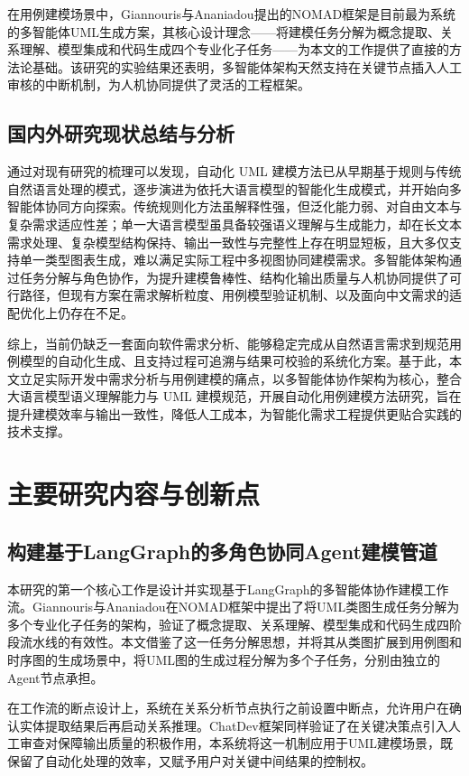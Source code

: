 在用例建模场景中，Giannouris与Ananiadou\cite{giannouris2025nomad}提出的NOMAD框架是目前最为系统的多智能体UML生成方案，其核心设计理念——将建模任务分解为概念提取、关系理解、模型集成和代码生成四个专业化子任务——为本文的工作提供了直接的方法论基础。该研究的实验结果还表明，多智能体架构天然支持在关键节点插入人工审核的中断机制，为人机协同提供了灵活的工程框架。

\subsection{国内外研究现状总结与分析}

通过对现有研究的梳理可以发现，自动化 UML 建模方法已从早期基于规则与传统自然语言处理的模式，逐步演进为依托大语言模型的智能化生成模式，并开始向多智能体协同方向探索。传统规则化方法虽解释性强，但泛化能力弱、对自由文本与复杂需求适应性差；单一大语言模型虽具备较强语义理解与生成能力，却在长文本需求处理、复杂模型结构保持、输出一致性与完整性上存在明显短板，且大多仅支持单一类型图表生成，难以满足实际工程中多视图协同建模需求。多智能体架构通过任务分解与角色协作，为提升建模鲁棒性、结构化输出质量与人机协同提供了可行路径，但现有方案在需求解析粒度、用例模型验证机制、以及面向中文需求的适配优化上仍存在不足。

综上，当前仍缺乏一套面向软件需求分析、能够稳定完成从自然语言需求到规范用例模型的自动化生成、且支持过程可追溯与结果可校验的系统化方案。基于此，本文立足实际开发中需求分析与用例建模的痛点，以多智能体协作架构为核心，整合大语言模型语义理解能力与 UML 建模规范，开展自动化用例建模方法研究，旨在提升建模效率与输出一致性，降低人工成本，为智能化需求工程提供更贴合实践的技术支撑。

\section{主要研究内容与创新点}

\subsection{构建基于LangGraph的多角色协同Agent建模管道}

本研究的第一个核心工作是设计并实现基于LangGraph的多智能体协作建模工作流。Giannouris与Ananiadou\cite{giannouris2025nomad}在NOMAD框架中提出了将UML类图生成任务分解为多个专业化子任务的架构，验证了概念提取、关系理解、模型集成和代码生成四阶段流水线的有效性。本文借鉴了这一任务分解思想，并将其从类图扩展到用例图和时序图的生成场景中，将UML图的生成过程分解为多个子任务，分别由独立的Agent节点承担。

在工作流的断点设计上，系统在关系分析节点执行之前设置中断点，允许用户在确认实体提取结果后再启动关系推理。ChatDev框架\cite{qian2023chatdev}同样验证了在关键决策点引入人工审查对保障输出质量的积极作用，本系统将这一机制应用于UML建模场景，既保留了自动化处理的效率，又赋予用户对关键中间结果的控制权。

